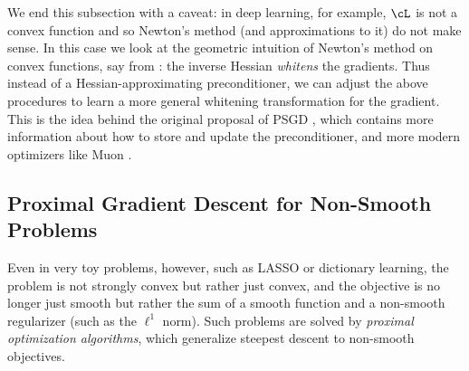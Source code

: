 \documentclass[../../book-main.tex]{subfiles}
\begin{document}
We end this subsection with a caveat: in deep learning, for example, \(\cL\) is not a convex function and so Newton's method (and approximations to it) do not make sense. In this case we look at the geometric intuition of Newton's method on convex functions, say from : the inverse Hessian \textit{whitens} the gradients. Thus instead of a Hessian-approximating preconditioner, we can adjust the above procedures to learn a more general whitening transformation for the gradient. This is the idea behind the original proposal of PSGD \cite{li2017preconditioned}, which contains more information about how to store and update the preconditioner, and more modern optimizers like Muon \cite{liu2025muon}.


\subsection{Proximal Gradient Descent for Non-Smooth Problems}\label{subsec:pgd}

Even in very toy problems, however, such as LASSO or dictionary learning, the problem is not strongly convex but rather just convex, and the objective is no longer just smooth but rather the sum of a smooth function and a non-smooth regularizer (such as the \(\ell^{1}\) norm). Such problems are solved by \textit{proximal optimization algorithms}, which generalize steepest descent to non-smooth objectives.
\end{document}
